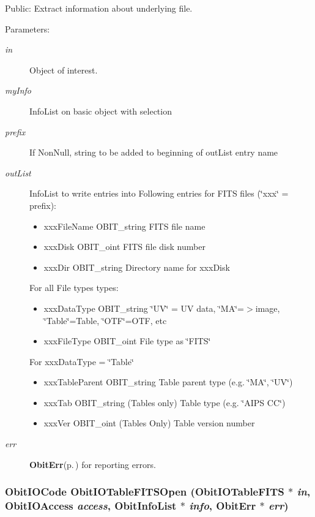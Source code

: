 Public: Extract information about underlying file. 

\begin{Desc}
\item[Parameters:]
\begin{description}
\item[{\em in}]Object of interest. \item[{\em my\-Info}]Info\-List on basic object with selection \item[{\em prefix}]If Non\-Null, string to be added to beginning of out\-List entry name \item[{\em out\-List}]Info\-List to write entries into Following entries for FITS files (\char`\"{}xxx\char`\"{} = prefix): \begin{itemize}
\item xxx\-File\-Name OBIT\_\-string FITS file name \item xxx\-Disk OBIT\_\-oint FITS file disk number \item xxx\-Dir OBIT\_\-string Directory name for xxx\-Disk\end{itemize}
For all File types types: \begin{itemize}
\item xxx\-Data\-Type OBIT\_\-string \char`\"{}UV\char`\"{} = UV data, \char`\"{}MA\char`\"{}=$>$image, \char`\"{}Table\char`\"{}=Table, \char`\"{}OTF\char`\"{}=OTF, etc \item xxx\-File\-Type OBIT\_\-oint File type as \char`\"{}FITS\char`\"{}\end{itemize}
For xxx\-Data\-Type = \char`\"{}Table\char`\"{} \begin{itemize}
\item xxx\-Table\-Parent OBIT\_\-string Table parent type (e.g. \char`\"{}MA\char`\"{}, \char`\"{}UV\char`\"{}) \item xxx\-Tab OBIT\_\-string (Tables only) Table type (e.g. \char`\"{}AIPS CC\char`\"{}) \item xxx\-Ver OBIT\_\-oint (Tables Only) Table version number\end{itemize}
\item[{\em err}]{\bf Obit\-Err}{\rm (p.\,\pageref{structObitErr})} for reporting errors. \end{description}
\end{Desc}
\subsubsection{\setlength{\rightskip}{0pt plus 5cm}Obit\-IOCode Obit\-IOTable\-FITSOpen ({\bf Obit\-IOTable\-FITS} $\ast$ {\em in}, Obit\-IOAccess {\em access}, {\bf Obit\-Info\-List} $\ast$ {\em info}, {\bf Obit\-Err} $\ast$ {\em err})}\label{ObitIOTableFITS_8h_a9}


